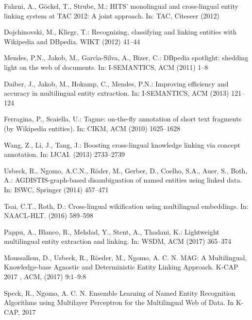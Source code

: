 \documentclass{llncs}
\begin{document}
\begin{thebibliography}{99}
Fahrni, A., G{\"o}ckel, T., Strube, M.: {HITS'} monolingual and cross-lingual entity linking system at {TAC} 2012: A joint approach. In: TAC, Citeseer (2012)

Dojchinovski, M., Kliegr, T.: Recognizing, classifying and linking entities with {W}ikipedia and {DB}pedia. WIKT (2012) 41--44

Mendes, P.N., Jakob, M., Garc{\'\i}a-Silva, A., Bizer, C.: {DB}pedia spotlight: shedding light on the web of documents. In: I-SEMANTICS, ACM (2011) 1--8

Daiber, J., Jakob, M., Hokamp, C., Mendes, P.N.: Improving efficiency and accuracy in multilingual entity extraction. In: I-SEMANTICS, ACM (2013) 121--124

Ferragina, P., Scaiella, U.: Tagme: on-the-fly annotation of short text fragments (by Wikipedia entities). In: CIKM, ACM (2010) 1625--1628


Wang, Z., Li, J., Tang, J.: Boosting cross-lingual knowledge linking via concept annotation. In: IJCAI. (2013) 2733--2739

Usbeck, R., Ngomo, A.C.N., R{\"o}der, M., Gerber, D., Coelho, S.A., Auer, S., Both, A.: {AGDISTIS}-graph-based disambiguation of named entities using linked data. In: ISWC, Springer (2014) 457--471

Tsai, C.T., Roth, D.: Cross-lingual wikification using multilingual embeddings. In: NAACL-HLT. (2016) 589--598

Pappu, A., Blanco, R., Mehdad, Y., Stent, A., Thadani, K.: Lightweight multilingual entity extraction and linking. In: WSDM, ACM (2017) 365--374

Moussallem, D., Usbeck, R., R\"oeder, M., Ngomo, A. C. N. {MAG}: {A} Multilingual, Knowledge-base Agnostic and Deterministic Entity Linking Approach. {K-CAP} 2017 , ACM, (2017) 9:1--9:8

Speck, R., Ngomo, A. C. N. {E}nsemble Learning of Named Entity Recognition Algorithms using Multilayer Perceptron for the Multilingual Web of Data. In K-CAP, 2017


\end{thebibliography}
\end{document}
